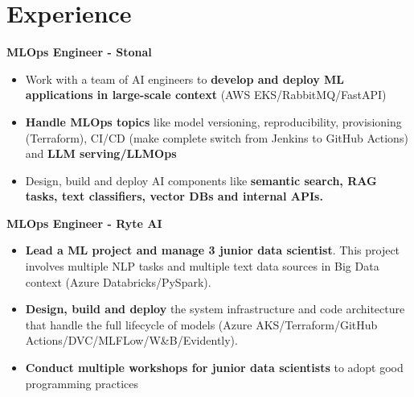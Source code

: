 \documentclass[a4paper,10pt]{article}
\begin{document}
\begin{adjustbox}{valign=t}
    \begin{minipage}{0.6\textwidth}
        \vspace{.5cm}
        \section*{Experience}
        \vspace{-.3cm}
        \begin{description}
            \raggedright
            \item[\normalfont \textcolor{ColorOne}{Since Jan. 2024}]
                \textbf{MLOps Engineer - Stonal}\\
                \small
                \begin{itemize}[topsep=0pt]
                    \item Work with a team of AI engineers to \textbf{develop and deploy ML applications in large-scale context} (AWS EKS/RabbitMQ/FastAPI)
                    \item \textbf{Handle MLOps topics} like model versioning, reproducibility, provisioning (Terraform), CI/CD (make complete switch from Jenkins to GitHub Actions) and \textbf{LLM serving/LLMOps}
                    \item Design, build and deploy AI components like \textbf{semantic search, RAG tasks, text classifiers, vector DBs and internal APIs.}
                \end{itemize}
                \normalsize
            \item[\normalfont \textcolor{ColorOne}{Oct. 2023 -- Jan. 2024}]
                \textbf{MLOps Engineer - Ryte AI}\\
                \small
                \begin{itemize}[topsep=0pt]
                    \item \textbf{Lead a ML project and manage 3 junior data scientist}. This project involves multiple NLP tasks and multiple text data sources in Big Data context (Azure Databricks/PySpark).
                    \item \textbf{Design, build and deploy} the system infrastructure and code architecture that handle the full lifecycle of models (Azure AKS/Terraform/GitHub Actions/DVC/MLFLow/W\&B/Evidently).
                    \item \textbf{Conduct multiple workshops for junior data scientists} to adopt good programming practices
                \end{itemize}

\end{description}
\end{minipage}
\end{adjustbox}
\end{document}
